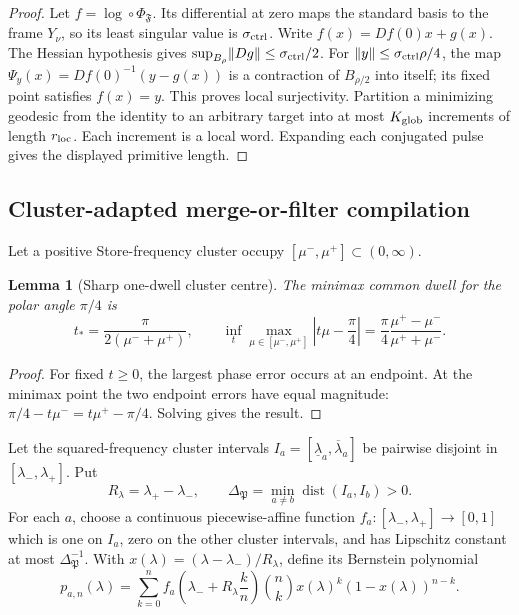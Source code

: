 \documentclass[11pt]{article}
\newtheorem{lemma}[theorem]{Lemma}
\theoremstyle{definition}
\theoremstyle{remark}
\newcommand{\norm}[1]{\lVert#1\rVert}
\newcommand{\dist}{\operatorname{dist}}
\begin{document}
\begin{proof}
Let $f=\log\circ\Phi_{\mathfrak F}$.  Its differential at zero maps the
standard basis to the frame $Y_\nu$, so its least singular value is
$\sigma_{\rm ctrl}$.  Write $f(x)=Df(0)x+g(x)$.  The Hessian hypothesis gives
$\sup_{B_\rho}\norm{Dg}\le\sigma_{\rm ctrl}/2$.  For
$\norm y\le\sigma_{\rm ctrl}\rho/4$, the map
$\Psi_y(x)=Df(0)^{-1}(y-g(x))$ is a contraction of $B_{\rho/2}$ into itself;
its fixed point satisfies $f(x)=y$.  This proves local surjectivity.  Partition
a minimizing geodesic from the identity to an arbitrary target into at most
$K_{\rm glob}$ increments of length $r_{\rm loc}$.  Each increment is a local
word.  Expanding each conjugated pulse gives the displayed primitive length.
\end{proof}

\subsection{Cluster-adapted merge-or-filter compilation}

Let a positive Store-frequency cluster occupy
$[\mu^-,\mu^+]\subset(0,\infty)$.

\begin{lemma}[Sharp one-dwell cluster centre]
\label{lem:cluster-common-dwell-master}
The minimax common dwell for the polar angle $\pi/4$ is
\begin{equation}
 \boxed{
 t_*=\frac{\pi}{2(\mu^-+\mu^+)},
 \qquad
 \inf_t\max_{\mu\in[\mu^-,\mu^+]}
 \left|t\mu-\frac\pi4\right|
 =\frac\pi4\frac{\mu^+-\mu^-}{\mu^++\mu^-}.}
 \label{eq:cluster-common-dwell-master}
\end{equation}
\end{lemma}

\begin{proof}
For fixed $t\ge0$, the largest phase error occurs at an endpoint.  At the
minimax point the two endpoint errors have equal magnitude:
$\pi/4-t\mu^-=t\mu^+-\pi/4$.  Solving gives the result.
\end{proof}

Let the squared-frequency cluster intervals
$I_a=[\underline\lambda_a,\overline\lambda_a]$ be pairwise disjoint in
$[\lambda_-,\lambda_+]$.  Put
\[
 R_\lambda=\lambda_+-\lambda_-,
 \qquad
 \Delta_{\mathfrak P}=\min_{a\ne b}\dist(I_a,I_b)>0.
\]
For each $a$, choose a continuous piecewise-affine function
$f_a:[\lambda_-,\lambda_+]\to[0,1]$ which is one on $I_a$, zero on the other
cluster intervals, and has Lipschitz constant at most
$\Delta_{\mathfrak P}^{-1}$.  With
$x(\lambda)=(\lambda-\lambda_-)/R_\lambda$, define its Bernstein polynomial
\[
 p_{a,n}(\lambda)
 =\sum_{k=0}^{n}
 f_a\!\left(\lambda_-+R_\lambda\frac{k}{n}\right)
 \binom nk x(\lambda)^k(1-x(\lambda))^{n-k}.
\]
\end{document}
